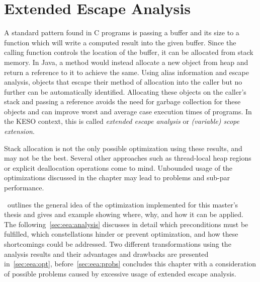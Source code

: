 
\chapter{Extended Escape Analysis}
	\label{chapter:eea}
	A standard pattern found in C programs is passing a buffer and its size to a function which will write a computed
	result into the given buffer. Since the calling function controls the location of the buffer, it can be allocated from
	stack memory. In Java, a method would instead allocate a new object from heap and return a reference to it to achieve
	the same. Using alias information and escape analysis, objects that escape their method of allocation into the caller
	but no further can be automatically identified. Allocating these objects on the caller's stack and passing a reference
	avoids the need for garbage collection for these objects and can improve worst and average case execution times of
	programs. In the KESO context, this is called \emph{extended escape analysis} or \emph{(variable) scope extension}.

	Stack allocation is not the only possible optimization using these results, and may not be the best. Several other
	approaches such as thread-local heap regions or explicit deallocation operations come to mind. Unbounded usage of the
	optimizations discussed in the chapter may lead to problems and sub-par performance.

	~outlines the general idea of the optimization implemented for this master's thesis and gives and
	example showing where, why, and how it can be applied. The following~\cref{sec:eea:analysis} discusses in detail which
	preconditions must be fulfilled, which constellations hinder or prevent optimization, and how these shortcomings could
	be addressed. Two different transformations using the analysis results and their advantages and drawbacks are
	presented in~\cref{sec:eea:opt}, before~\cref{sec:eea:probs} concludes this chapter with a consideration of possible
	problems caused by excessive usage of extended escape analysis.

